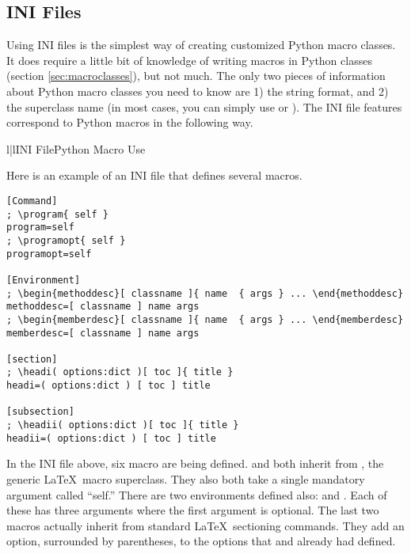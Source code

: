 \subsection{INI Files\label{sec:inimacros}}

Using INI files is the simplest way of creating customized Python macro
classes.  It does require a little bit of knowledge of writing
macros in Python classes (section \ref{sec:macroclasses}), but not
much.  The only two pieces of information about Python macro classes
you need to know are 1) the  string format, and 2)
the superclass name (in most cases, you can simply use 
or ).  The INI file features correspond to Python
macros in the following way.
\begin{tableii}{l|l}{}{INI File}{Python Macro Use}
\end{tableii}

Here is an example of an INI file that defines several macros.
\begin{verbatim}
[Command]
; \program{ self }
program=self
; \programopt{ self }
programopt=self

[Environment]
; \begin{methoddesc}[ classname ]{ name  { args } ... \end{methoddesc}
methoddesc=[ classname ] name args
; \begin{memberdesc}[ classname ]{ name  { args } ... \end{memberdesc}
memberdesc=[ classname ] name args

[section]
; \headi( options:dict )[ toc ]{ title }
headi=( options:dict ) [ toc ] title

[subsection]
; \headii( options:dict )[ toc ]{ title }
headii=( options:dict ) [ toc ] title
\end{verbatim}

In the INI file above, six macro are being defined.   and
 both inherit from , the generic
\LaTeX\ macro superclass.  They also both take a single mandatory argument
called ``self.''  There are two environments defined also:
 and .  Each of these
has three arguments where the first argument is optional.  The
last two macros actually inherit from standard \LaTeX\ sectioning commands.
They add an option, surrounded by parentheses, to the options that
 and  already had defined.

